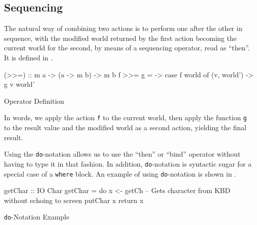 \subsection{Sequencing}\label{subsec:Sequencing}
The natural way of combining two actions is to perform one after the other in sequence, with the modified world returned by the first action becoming the current world for the second, by means of a sequencing operator, read as ``then''.
It is defined in .

\begin{listing}[h!tbp]
\begin{haskellsource}
(>>=) :: m a -> (a -> m b) -> m b
f >>= g = \world -> case f world of
                         (v, world') -> g v world'
\end{haskellsource}
\caption{\haskellinline{>>=} Operator Definition}
\label{lst:Then_Operator_Definition}
\end{listing}

In words, we apply the action \texttt{f} to the current world, then apply the function \texttt{g} to the result value and the modified world as a second action, yielding the final result.

Using the \texttt{do}-notation allows us to use the ``then'' or ``bind'' operator without having to type it in that fashion.
In addition, \texttt{do}-notation is syntactic sugar for a special case of a \texttt{where} block.
An example of using \texttt{do}-notation is shown in .

\begin{listing}[h!tbp]
\begin{haskellsource}
getChar :: IO Char
getChar = do x <- getCh -- Gets character from KBD without echoing to screen
             putChar x
             return x
\end{haskellsource}
\caption{\texttt{do}-Notation Example}
\label{lst:Do_Notation_Example}
\end{listing}


